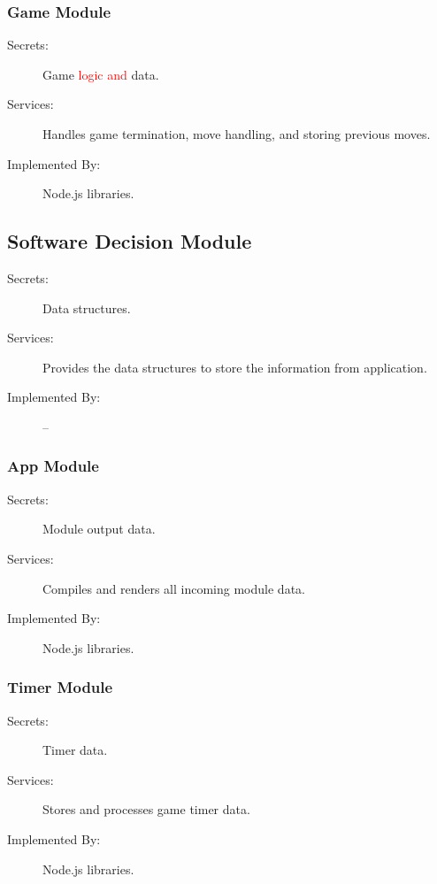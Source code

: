 \documentclass[12pt, titlepage]{article}
\begin{document}
    \subsubsection{Game Module \label{mGame}}
    \begin{description}
    \item[Secrets:] Game \textcolor{red}{logic and} data.
    \item[Services:] Handles game termination, move handling, and storing previous moves.
    \item[Implemented By:] Node.js libraries.
    \end{description}
    
\subsection{Software Decision Module \label{mSH}}
\begin{description}
\item[Secrets:] Data structures.
\item[Services:] Provides the data structures to store the information from application.
\item[Implemented By:] --
\end{description}

    \subsubsection{App Module \label{mApp}}
    \begin{description}
    \item[Secrets:] Module output data.
    \item[Services:] Compiles and renders all incoming module data.
    \item[Implemented By:] Node.js libraries.
    \end{description}
    
    \subsubsection{Timer Module \label{mTimer}}
    \begin{description}
    \item[Secrets:] Timer data.
    \item[Services:] Stores and processes game timer data.
    \item[Implemented By:] Node.js libraries.
    \end{description}
    
\end{document}
